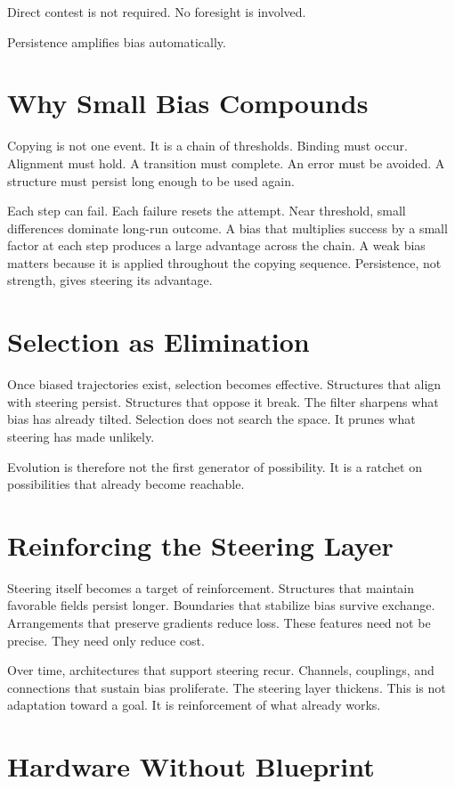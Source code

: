 \documentclass[11pt,twoside,openright]{book}
\begin{document}
Direct contest is not required. No foresight is involved.

Persistence amplifies bias automatically.
\section*{Why Small Bias Compounds}

Copying is not one event. It is a chain of thresholds. Binding must occur. Alignment must hold. A transition must complete. An error must be avoided. A structure must persist long enough to be used again.

Each step can fail. Each failure resets the attempt. Near threshold, small differences dominate long-run outcome. A bias that multiplies success by a small factor at each step produces a large advantage across the chain. A weak bias matters because it is applied throughout the copying sequence. Persistence, not strength, gives steering its advantage.

\section*{Selection as Elimination}

Once biased trajectories exist, selection becomes effective. Structures that align with steering persist. Structures that oppose it break. The filter sharpens what bias has already tilted. Selection does not search the space. It prunes what steering has made unlikely.

Evolution is therefore not the first generator of possibility. It is a ratchet on possibilities that already become reachable.

\section*{Reinforcing the Steering Layer}

Steering itself becomes a target of reinforcement. Structures that maintain favorable fields persist longer. Boundaries that stabilize bias survive exchange. Arrangements that preserve gradients reduce loss. These features need not be precise. They need only reduce cost.

Over time, architectures that support steering recur. Channels, couplings, and connections that sustain bias proliferate. The steering layer thickens. This is not adaptation toward a goal. It is reinforcement of what already works.

\section*{Hardware Without Blueprint}
\end{document}
